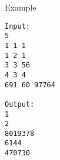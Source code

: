 Example  
\begin{verbatim}
Input:
5
1 1 1
1 2 1
3 3 56
4 3 4
691 60 97764

Output:
1
2
8019378
6144
470730 
\end{verbatim}